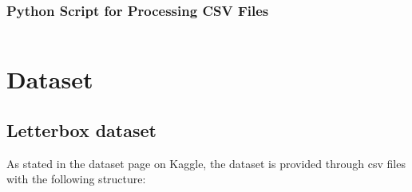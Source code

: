 \documentclass{Configuration_Files/PoliMi3i_thesis}
\begin{document}
\subsection*{Python Script for Processing CSV Files}

\inputminted{python}{formula1/formula1QualiWrangling.py}

\chapter{Dataset}

\section{Letterbox dataset}

As stated in the dataset page on Kaggle, the dataset is provided through csv files with the following structure:
\end{document}
